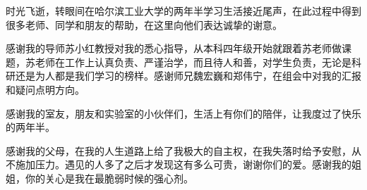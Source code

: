 \begin{acknowledgements}

    时光飞逝，转眼间在哈尔滨工业大学的两年半学习生活接近尾声，在此过程中得到很多老师、同学和朋友的帮助，在这里向他们表达诚挚的谢意。

    感谢我的导师苏小红教授对我的悉心指导，从本科四年级开始就跟着苏老师做课题，苏老师在工作上认真负责、严谨治学，而且待人和善，对学生负责，无论是科研还是为人都是我们学习的榜样。感谢师兄魏宏巍和郑伟宁，在组会中对我的汇报和疑问点明方向。
    
    感谢我的室友，朋友和实验室的小伙伴们，生活上有你们的陪伴，让我度过了快乐的两年半。
    
    感谢我的父母，在我的人生道路上给了我极大的自主权，在我失落时给予安慰，从不施加压力。遇见的人多了之后才发现这有多么可贵，谢谢你们的爱。感谢我的姐姐，你的关心是我在最脆弱时候的强心剂。

\end{acknowledgements}
